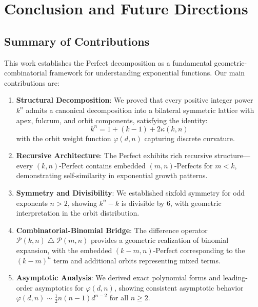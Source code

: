 \documentclass[11pt]{article}
\DeclareMathOperator{\diffop}{\triangle}
\newcommand{\diff}{\mathbin{\diffop}}
\newcommand{\perfect}{\mathcal{P}}
\begin{document}

\section{Conclusion and Future Directions}

\subsection{Summary of Contributions}

This work establishes the Perfect decomposition as a fundamental geometric-combinatorial framework for understanding exponential functions. Our main contributions are:

\begin{enumerate}
\item \textbf{Structural Decomposition}: We proved that every positive integer power $k^n$ admits a canonical decomposition into a bilateral symmetric lattice with apex, fulcrum, and orbit components, satisfying the identity:
\[
k^n = 1 + (k-1) + 2\kappa(k,n)
\]
with the orbit weight function $\varphi(d,n)$ capturing discrete curvature.

\item \textbf{Recursive Architecture}: The Perfect exhibits rich recursive structure—every $(k,n)$-Perfect contains embedded $(m,n)$-Perfects for $m < k$, demonstrating self-similarity in exponential growth patterns.

\item \textbf{Symmetry and Divisibility}: We established sixfold symmetry for odd exponents $n > 2$, showing $k^n - k$ is divisible by 6, with geometric interpretation in the orbit distribution.

\item \textbf{Combinatorial-Binomial Bridge}: The difference operator $\perfect(k,n) \diff \perfect(m,n)$ provides a geometric realization of binomial expansion, with the embedded $(k-m,n)$-Perfect corresponding to the $(k-m)^n$ term and additional orbits representing mixed terms.

\item \textbf{Asymptotic Analysis}: We derived exact polynomial forms and leading-order asymptotics for $\varphi(d,n)$, showing consistent asymptotic behavior $\varphi(d,n) \sim \frac{1}{2}n(n-1)d^{n-2}$ for all $n \geq 2$.
\end{enumerate}
\end{document}

